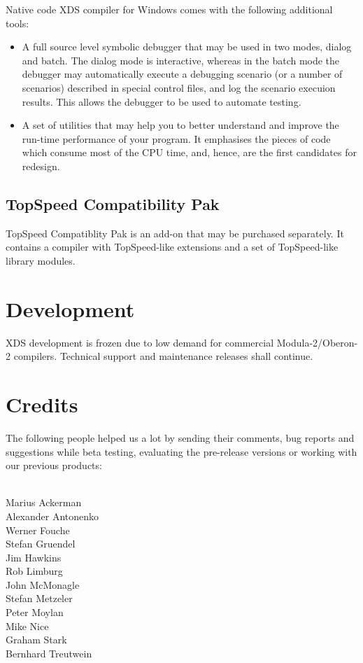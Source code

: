 Native code XDS compiler for Windows comes with the
following additional tools:

\begin{itemize}
\item A full source level symbolic debugger that may be used in two modes,
      dialog and batch. The dialog mode is interactive, whereas in the 
      batch mode the debugger may automatically execute a debugging scenario 
      (or a number of scenarios) described in special control files, 
      and log the scenario execuion results. 
      This allows the debugger to be used to automate testing. 
\item A set of utilities that may help you to better understand and 
      improve the run-time performance of your program. It emphasises 
      the pieces of code which consume most of the CPU time, and, 
      hence, are the first candidates for redesign. 
\end{itemize}

\section{TopSpeed Compatibility Pak}

TopSpeed Compatiblity Pak is an add-on that may be purchased
separately. It contains a compiler with TopSpeed-like extensions and
a set of TopSpeed-like library modules.

\chapter{Development}
\label{development}

XDS development is frozen due to low demand for commercial Modula-2/Oberon-2
compilers. Technical support and maintenance releases shall continue.

\chapter{Credits}
\label{credits}

The following people helped us a lot by sending their comments, bug reports
and suggestions while beta testing, evaluating the pre-release versions or
working with our previous products:

\begin{center}
\\
Marius Ackerman \\
Alexander Antonenko \\
Werner Fouche   \\
Stefan Gruendel \\
Jim Hawkins     \\
Rob Limburg     \\
John McMonagle  \\
Stefan Metzeler \\
Peter Moylan    \\
Mike Nice       \\
Graham Stark    \\
Bernhard Treutwein 
\end{center}


